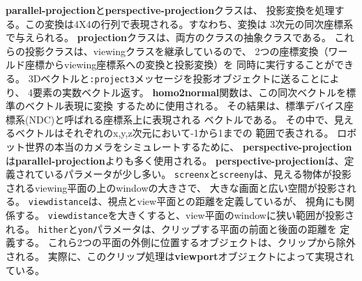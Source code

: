 {\bf parallel-projection}と{\bf perspective-projection}クラスは、
投影変換を処理する。この変換は4X4の行列で表現される。すなわち、変換は
3次元の同次座標系で与えられる。
{\bf projection}クラスは、両方のクラスの抽象クラスである。
これらの投影クラスは、viewingクラスを継承しているので、
2つの座標変換（ワールド座標からviewing座標系への変換と投影変換）を
同時に実行することができる。
3Dベクトルと{\tt :project3}メッセージを投影オブジェクトに送ることにより、
4要素の実数ベクトル返す。
{\bf homo2normal}関数は、この同次ベクトルを標準のベクトル表現に変換
するために使用される。
その結果は、標準デバイス座標系(NDC)と呼ばれる座標系上に表現される
ベクトルである。
その中で、見えるベクトルはそれぞれのx,y,z次元において-1から1までの
範囲で表される。
ロボット世界の本当のカメラをシミュレートするために、
{\bf perspective-projection}は{\bf parallel-projection}よりも多く使用される。
{\bf perspective-projection}は、定義されているパラメータが少し多い。
{\tt screenx}と{\tt screeny}は、見える物体が投影されるviewing平面の上のwindowの大きさで、
大きな画面と広い空間が投影される。
{\tt viewdistance}は、視点とview平面との距離を定義しているが、
視角にも関係する。
{\tt viewdistance}を大きくすると、view平面のwindowに狭い範囲が投影される。
{\tt hither}と{\tt yon}パラメータは、クリップする平面の前面と後面の距離を
定義する。
これら2つの平面の外側に位置するオブジェクトは、クリップから除外される。
実際に、このクリップ処理は{\bf viewport}オブジェクトによって実現されている。

